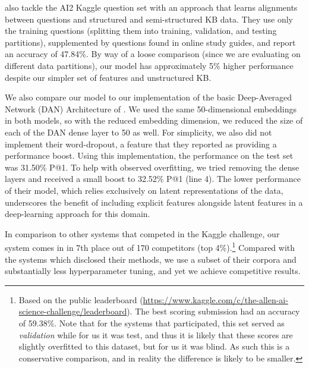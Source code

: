 
\citet{sachan2016science} also tackle the AI2 Kaggle question set with an approach  that learns alignments between questions and structured and semi-structured KB data.
They use only the training questions (splitting them into training, validation, and testing partitions), supplemented by questions found in online study guides, and report an accuracy of 47.84\%.  By way of a loose comparison (since we are evaluating on different data partitions), our model has approximately 5\% higher performance despite our simpler set of features and unstructured KB.  

We also compare our model to our implementation of the basic Deep-Averaged Network (DAN) Architecture of \citet{Iyyer2015}.  %
We used the same 50-dimensional embeddings in both models, so with the reduced embedding dimension, we reduced the size of each of the DAN dense layer to 50 as well.  For simplicity, we also did not implement their word-dropout, a feature that they reported as providing a performance boost. Using this implementation, the performance on the test set was 31.50\% P@1.  To help with observed overfitting, we tried removing the dense layers and received a small boost to 32.52\% P@1 (line 4).  
The lower performance of their model, which relies exclusively on latent representations of the data, underscores the benefit of including explicit features alongside latent features in a deep-learning approach for this domain.

In comparison to other systems that competed in the Kaggle challenge, our system comes in in 7th place out of 170 competitors (top 4\%).\footnote{Based on the public leaderboard ({\scriptsize \url{https://www.kaggle.com/c/the-allen-ai-science-challenge/leaderboard}}). The best scoring submission had an accuracy of 59.38\%.  Note that for the systems that participated, this set served as \emph{validation} while for us it was test, and thus it is likely that these scores are slightly overfitted to this dataset, but for us it was blind.  As such this is a conservative comparison, and in reality the difference is likely to be smaller.}  Compared with the systems which disclosed their methods, we use a subset of their corpora and substantially less hyperparameter tuning, and yet we achieve competitive results.  

